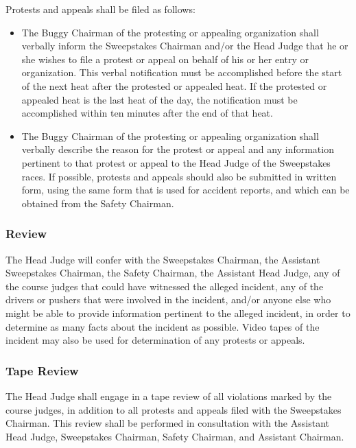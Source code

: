 	Protests and appeals shall be filed as follows:

	\begin{itemize}

		\item
		The Buggy Chairman of the protesting or appealing organization shall verbally inform the Sweepstakes Chairman and/or the Head Judge that he or she wishes to file a protest or appeal on behalf of his or her entry or organization. This verbal notification must be accomplished before the start of the next heat after the protested or appealed heat. If the protested or appealed heat is the last heat of the day, the notification must be accomplished within ten minutes after the end of that heat.

		\item
		The Buggy Chairman of the protesting or appealing organization shall verbally describe the reason for the protest or appeal and any information pertinent to that protest or appeal to the Head Judge of the Sweepstakes races. If possible, protests and appeals should also be submitted in written form, using the same form that is used for accident reports, and which can be obtained from the Safety Chairman.

	\end{itemize}

\subsubsection{Review}

	The Head Judge will confer with the Sweepstakes Chairman, the Assistant Sweepstakes Chairman, the Safety Chairman, the Assistant Head Judge, any of the course judges that could have witnessed the alleged incident, any of the drivers or pushers that were involved in the incident, and/or anyone else who might be able to provide information pertinent to the alleged incident, in order to determine as many facts about the incident as possible. Video tapes of the incident may also be used for determination of any protests or appeals.

\subsubsection{Tape Review}

	The Head Judge shall engage in a tape review of all violations marked by the course judges, in addition to all protests and appeals filed with the Sweepstakes Chairman. This review shall be performed in	consultation with the Assistant Head Judge, Sweepstakes Chairman, Safety Chairman, and Assistant Chairman.

